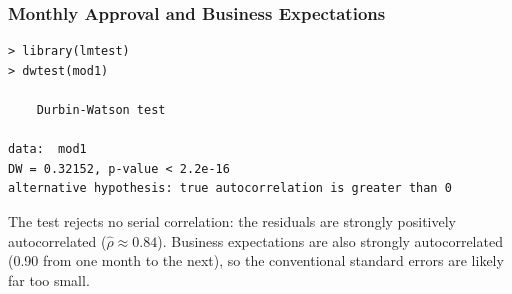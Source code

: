 \documentclass[xcolor=svgnames,9pt,english,aspectratio=169,t]{beamer}
\begin{document}
\begin{frame}[fragile]
\frametitle{Monthly Approval and Business Expectations}

\begin{Verbatim}[fontsize=\footnotesize, frame=single, label=R Code, commandchars=\\\{\}]
> library(lmtest)
> dwtest(mod1)

	Durbin-Watson test

data:  mod1
DW = 0.32152, p-value < 2.2e-16
alternative hypothesis: true autocorrelation is greater than 0
\end{Verbatim}
The test rejects no serial correlation: the residuals are strongly positively autocorrelated ($\hat\rho \approx 0.84$). Business expectations are also strongly autocorrelated (0.90 from one month to the next), so the conventional standard errors are likely far too small.
\end{frame}


%
%
%
%
%
\end{document}

